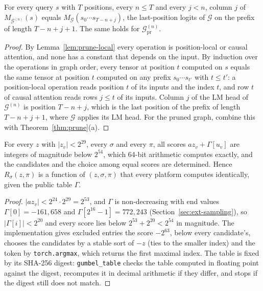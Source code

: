 \begin{lemma}
\label{lem:causal}
For every query $s$ with $T$ positions, every $n\le T$ and every $j<n$, column $j$ of
$M_{\mathcal G^{(n)}}(s)$ equals $M_{\mathcal G}(s_0\cdots s_{T-n+j})$, the last-position logits
of $\mathcal G$ on the prefix of length $T-n+j+1$. The same holds for
$\mathcal G^{(n)}_{\mathrm{pr}}$.
\end{lemma}

\begin{proof}
By Lemma~\ref{lem:prune-local} every operation is position-local or causal attention, and none has
a constant that depends on the input. By induction over the operations in graph order, every tensor
at position $t$ computed on $s$ equals the same tensor at position $t$ computed on any prefix
$s_0\cdots s_{t'}$ with $t\le t'$: a position-local operation reads position $t$ of its inputs and
the index $t$, and row $t$ of causal attention reads rows $j\le t$ of its inputs. Column $j$ of the
LM head of $\mathcal G^{(n)}$ is position $T-n+j$, which is the last position of the prefix of
length $T-n+j+1$, where $\mathcal G$ applies its LM head. For the pruned graph, combine this with
Theorem~\ref{thm:prune}(a).
\end{proof}

\begin{lemma}
\label{lem:sampler}
For every $z$ with $|z_v|<2^{29}$, every $\sigma$ and every $\pi$, all scores $az_v+\Gamma[u_v]$
are integers of magnitude below $2^{54}$, which 64-bit arithmetic computes exactly, and the
candidates and the choice among equal scores are determined. Hence $R_\sigma(z,\pi)$ is a function
of $(z,\sigma,\pi)$ that every platform computes identically, given the public table $\Gamma$.
\end{lemma}

\begin{proof}
$|az_v|<2^{24}\cdot2^{29}=2^{53}$, and $\Gamma$ is non-decreasing with end values
$\Gamma[0]=-161{,}658$ and $\Gamma[2^{16}-1]=772{,}243$ (Section~\ref{sec:ext-sampling}), so
$|\Gamma[i]|<2^{20}$ and every score lies below $2^{53}+2^{20}<2^{54}$ in magnitude. The
implementation gives excluded entries the score $-2^{63}$, below every candidate's, chooses the
candidates by a stable sort of $-z$ (ties to the smaller index) and the token by
\texttt{torch.argmax}, which returns the first maximal index. The table is fixed by its SHA-256
digest: \texttt{gumbel\_table} checks the table computed in floating point against the digest,
recomputes it in decimal arithmetic if they differ, and stops if the digest still does not match.
\end{proof}

